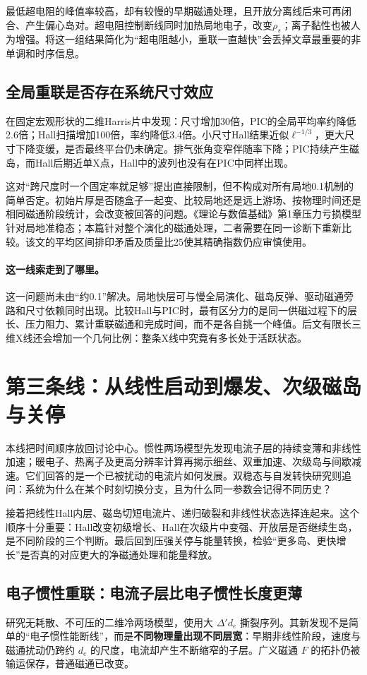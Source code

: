 \documentclass[UTF8,a4paper,11pt,openany,fontset=fandol]{ctexbook}
\begin{document}
最低超电阻的峰值率较高，却有较慢的早期磁通处理，且开放分离线后来可再闭合、产生偏心岛对。超电阻控制断线同时加热局地电子，改变$\rho_s$；离子黏性也被人为增强。将这一组结果简化为“超电阻越小，重联一直越快”会丢掉文章最重要的非单调和时序信息。

\subsection{全局重联是否存在系统尺寸效应}
\citet{F600}在固定宏观形状的二维Harris片中发现：尺寸增加30倍，PIC的全局平均率约降低2.6倍；Hall扫描增加100倍，率约降低3.4倍。小尺寸Hall结果近似$\ell^{-1/3}$，更大尺寸下降变缓，是否最终平台仍未确定。排气张角变窄伴随率下降；PIC持续产生磁岛，而Hall后期近单X点，Hall中的波列也没有在PIC中同样出现。

这对“跨尺度时一个固定率就足够”提出直接限制，但不构成对所有局地0.1机制的简单否定。初始片厚是否随盒子一起变、比较局地还是远上游场、按物理时间还是相同磁通阶段统计，会改变被回答的问题。《理论与数值基础》第1章压力亏损模型针对局地准稳态；本篇针对整个演化的磁通处理，二者需要在同一诊断下重新比较。该文的平均区间排印矛盾及质量比25使其精确指数仍应审慎使用。

\paragraph{这一线索走到了哪里。}这一问题尚未由“约0.1”解决。局地快层可与慢全局演化、磁岛反弹、驱动磁通旁路和尺寸依赖同时出现。比较Hall与PIC时，最有区分力的是同一供磁过程下的层长、压力阻力、累计重联磁通和完成时间，而不是各自挑一个峰值。后文有限长三维X线还会增加一个几何比例：整条X线中究竟有多长处于活跃状态。

\section{第三条线：从线性启动到爆发、次级磁岛与关停}\label{story:onset}
本线把时间顺序放回讨论中心。惯性两场模型先发现电流子层的持续变薄和非线性加速；暖电子、热离子及更高分辨率计算再揭示细丝、双重加速、次级岛与间歇减速。它们回答的是一个已被扰动的电流片如何发展。双稳态与自发转快研究则追问：系统为什么在某个时刻切换分支，且为什么同一参数会记得不同历史？

接着把线性Hall内层、磁岛切短电流片、递归破裂和非线性状态选择连起来。这个顺序十分重要：Hall改变初级增长、Hall在次级片中变强、开放层是否继续生岛，是不同阶段的三个判断。最后回到压强关停与能量转换，检验“更多岛、更快增长”是否真的对应更大的净磁通处理和能量释放。

\subsection{电子惯性重联：电流子层比电子惯性长度更薄}
\citet{Ottaviani1993}研究无耗散、不可压的二维冷两场模型，使用大 $\Delta'd_e$ 撕裂序列。其新发现不是简单的“电子惯性能断线”，而是\textbf{不同物理量出现不同层宽}：早期非线性阶段，速度与磁通扰动仍跨约 $d_e$ 的尺度，电流却产生不断缩窄的子层。广义磁通 $F$ 的拓扑仍被输运保存，普通磁通已改变。
\end{document}

